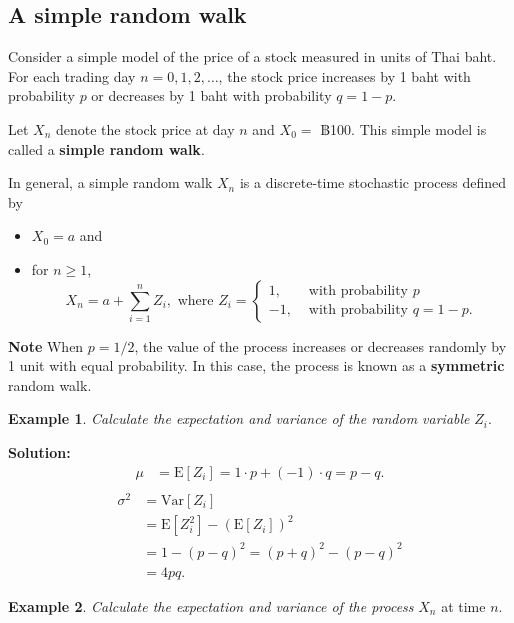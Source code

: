 \documentclass[
]{book}
\theoremstyle{definition}
\theoremstyle{definition}
\newtheorem{example}{Example}[chapter]
\theoremstyle{definition}
\theoremstyle{definition}
\theoremstyle{remark}
\begin{document}
\hypertarget{a-simple-random-walk}{%
\subsection{A simple random walk}\label{a-simple-random-walk}}

Consider a simple model of the price of a stock measured in units of
Thai baht. For each trading day \(n = 0,1,2, \ldots\), the stock price
increases by 1 baht with probability \(p\) or decreases by 1 baht with
probability \(q = 1-p\).

Let \(X_n\) denote the stock price at day \(n\) and \(X_0 =\) ฿100. This
simple model is called a \textbf{simple random walk}.

In general, a simple random walk \(X_n\) is a discrete-time stochastic
process defined by

\begin{itemize}
\item
  \(X_0 = a\) and
\item
  for \(n \ge1\),
  \[X_n = a + \sum_{i=1}^n  Z_i, \text{ where } Z_i = \begin{cases}
      1, & \text{ with probability } p  \\
      -1, & \text{ with probability } q =  1- p.
   \end{cases}\]
\end{itemize}

\textbf{Note} When \(p = 1/2\), the value of the process increases or decreases
randomly by 1 unit with equal probability. In this case, the process is
known as a \textbf{symmetric} random walk.

\begin{example}
\emph{Calculate the expectation and variance of the random variable} \(Z_i\).
\end{example}

\textbf{Solution:} \[\begin{aligned}
    \mu &= \mathrm{E}[Z_i] = 1\cdot p + (-1) \cdot q = p - q.\\\end{aligned}\]
\[\begin{aligned}
    \sigma^2 &= \mathrm{Var}[Z_i] \\
            &=\mathrm{E}[Z_i^2] - (\mathrm{E}[Z_i] )^2 \\
            &= 1 - (p-q)^2  = (p+q)^2 - (p-q)^2\\
            &= 4pq.\end{aligned}\]

\begin{example}
\emph{Calculate the expectation and variance of the process} \(X_n\) at time
\(n\).
\end{example}
\end{document}
